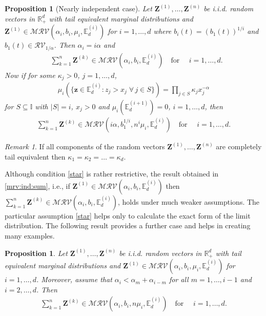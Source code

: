 \documentclass[aos]{imsart}
\numberwithin{equation}{section}
\theoremstyle{plain} %
\newtheorem{proposition}[theorem]{Proposition}
\theoremstyle{remark}
\newtheorem{remark}[theorem]{Remark}
\newcommand{\beao}{\begin{eqnarray*}}
\newcommand{\eeao}{\end{eqnarray*}\noindent}
\newcommand{\E}{\mathbb{E}}
\newcommand{\R}{\mathbb{R}}
\newcommand{\VF}[1]{{\color{blue} #1}}
\def\MRV{\mathcal{MRV}}
\def\RV{\mathcal{RV}}
\def\bZ{\boldsymbol Z}
\def\bz{\boldsymbol z}
\newcommand{\DAS}[1]{{\color{red} #1}}
\begin{document}
\begin{proposition}[Nearly independent case]\label{prop:ind}
Let $\bZ^{(1)},\ldots,\bZ^{(n)}$ be  i.i.d.  random vectors in $\R_+^d$ with tail equivalent marginal distributions and $\bZ^{(1)}\in\MRV(\alpha_i,b_i,\mu_i,\E_d^{(i)})$  for $i=1,\ldots,d$ where $b_i(t)=(b_1(t))^{1/i}$ and $b_1(t)\in \RV_{1/\alpha}$. Then $\alpha_i=i\alpha$ and
         \begin{align}\label{mrv:ind:sum}
               & \sum_{k=1}^n\bZ^{(k)}\in\MRV(\alpha_i,b_i,\E_d^{(i)}) \quad  \text {for } \quad i=1,\ldots,d.
         \end{align}
    Now if for some $\kappa_j>0$, $j=1,\ldots,d$,
           \begin{eqnarray} \label{star}
            \mu_i\left(\{\bz\in \E_d^{(i)}:z_j>x_j\; \forall\, j \in S\}\right)=\prod_{j\in S}\kappa_j x_j^{-\alpha}
           \end{eqnarray}
         for $S\subseteq \mathbb{I}$ with $|S|=i$,   $x_j>0$ and $\mu_i(\mathbb{E}_d^{(i+1)})=0$, $i=1,\ldots, d$, {then }%
         \beao                \sum_{k=1}^n\bZ^{(k)}\in\MRV(i\alpha,b_1^{1/i},n^{i}\mu_i,\E_d^{(i)}) \quad  \text {for } \quad i=1,\ldots,d.
         \eeao
\end{proposition}


\begin{remark}
If all components of the random vectors $\bZ^{(1)},\ldots,\bZ^{(n)}$ are completely tail equivalent then $\kappa_1=\kappa_2=\ldots=\kappa_d$.
\end{remark}
{Although  condition \eqref{star} is rather restrictive, the result obtained in \eqref{mrv:ind:sum}, i.e., \linebreak if $\bZ^{(1)}\in\MRV(\alpha_i,b_i ,\E_d^{(i)})$ then $\sum_{k=1}^n\bZ^{(k)}\in\MRV(\alpha_i,b_i,\E_d^{(i)})$, holds under much weaker assumptions. The  particular assumption \eqref{star} 
helps only to calculate the exact form of the limit distribution. The following result provides a further case and helps in creating many examples.}

\begin{proposition}\label{prop:mrv:tailsremainsame}
Let $\bZ^{(1)},\ldots,\bZ^{(n)}$ be  i.i.d.  random vectors in $\R_+^d$ with tail equivalent marginal distributions and  $\bZ^{(1)}\in\MRV(\alpha_i,b_i,\mu_i,\E_d^{(i)})$  for $i=1,\ldots,d$.
Moreover, assume that $\alpha_i<\alpha_m+\alpha_{i-m}$ for all $m= 1,\ldots, i-1$ and $i = 2,\ldots,d$. Then
 \beao
                \sum_{k=1}^n\bZ^{(k)}\in\MRV(\alpha_i,b_i,n\mu_i,\E_d^{(i)}) \quad  \text {for } \quad i=1,\ldots,d.
         \eeao
\end{proposition}
\end{document}
